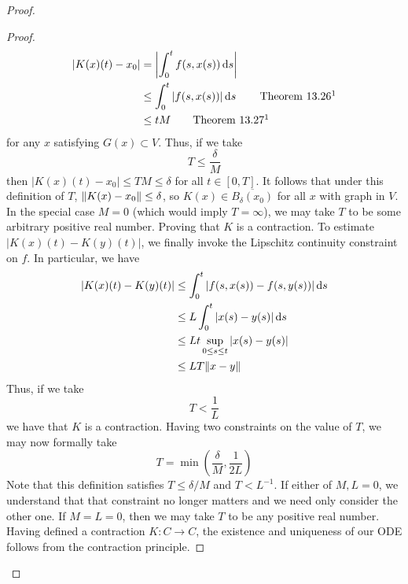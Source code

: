 \documentclass[../psets.tex]{subfiles}
\begin{document}
\begin{enumerate}
\begin{proof}
\begin{proof}
\begin{align*}
                |K(x)(t)-x_0| &= \left| \int_0^tf(s,x(s))\dd{s} \right|\\
                &\leq \int_0^t|f(s,x(s))|\dd{s}\tag*{Theorem 13.26\footnotemark}\\
                &\leq tM\tag*{Theorem 13.27\footnotemark[\value{footnote}]}
            \end{align*}
            for any $x$ satisfying $G(x)\subset V$.
            Thus, if we take
            \begin{equation*}
                T \leq \frac{\delta}{M}
            \end{equation*}
            then $|K(x)(t)-x_0|\leq TM\leq\delta$ for all $t\in[0,T]$.
            It follows that under this definition of $T$, $\norm{K(x)-x_0}\leq\delta$, so $K(x)\in\overline{B_\delta(x_0)}$ for all $x$ with graph in $V$.
            In the special case $M=0$ (which would imply $T=\infty$), we may take $T$ to be some arbitrary positive real number.
            Proving that $K$ is a contraction.
            To estimate $|K(x)(t)-K(y)(t)|$, we finally invoke the Lipschitz continuity constraint on $f$. In particular, we have
            \begin{align*}
                |K(x)(t)-K(y)(t)| &\leq \int_0^t|f(s,x(s))-f(s,y(s))|\dd{s}\\
                &\leq L\int_0^t|x(s)-y(s)|\dd{s}\\
                &\leq Lt\sup_{0\leq s\leq t}|x(s)-y(s)|\\
                &\leq LT\norm{x-y}
            \end{align*}
            Thus, if we take
            \begin{equation*}
                T < \frac{1}{L}
            \end{equation*}
            we have that $K$ is a contraction.
            Having two constraints on the value of $T$, we may now formally take
            \begin{equation*}
                T = \min\left( \frac{\delta}{M},\frac{1}{2L} \right)
            \end{equation*}
            Note that this definition satisfies $T\leq\delta/M$ and $T<L^{-1}$.
            If either of $M,L=0$, we understand that that constraint no longer matters and we need only consider the other one. If $M=L=0$, then we may take $T$ to be any positive real number.
            Having defined a contraction $K:C\to C$, the existence and uniqueness of our ODE follows from the contraction principle.

\end{proof}
\end{proof}
\end{enumerate}
\end{document}
